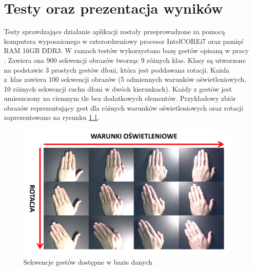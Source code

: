 \chapter{Testy oraz prezentacja wyników}
\label{cha: Tests}
Testy sprawdzające działanie aplikacji zostały przeprowadzone za pomocą komputera wyposażonego w czterordzeniowy procesor Intel\textregistered CORE\texttrademark i7 oraz pamięć RAM 16GB DDR3. 
W ramach testów wykorzystano bazę gestów opisaną w pracy \cite{Cambridge}. Zawiera ona 900 sekwencji obrazów tworząc 9 różnych klas. Klasy są utworzone na podstawie 3 prostych gestów dłoni, która jest poddawana rotacji. Każda z~klas zawiera 100 sekwencji obrazów (5 odmiennych warunków oświetleniowych, 10 różnych sekwencji ruchu dłoni w dwóch kierunkach). Każdy z gestów jest umieszczony na ciemnym tle bez dodatkowych elementów. Przykładowy zbiór obrazów reprezentujący gest dla różnych warunków oświetleniowych oraz rotacji zaprezentowano na rysunku \ref{im: Hands}.

\begin{figure}[h]
	\includegraphics[width=15cm]{Hands}
	\centering
	\caption{Sekwencje gestów dostępne w bazie danych \cite{Cambridge}}
	\label{im: Hands}
\end{figure} 

